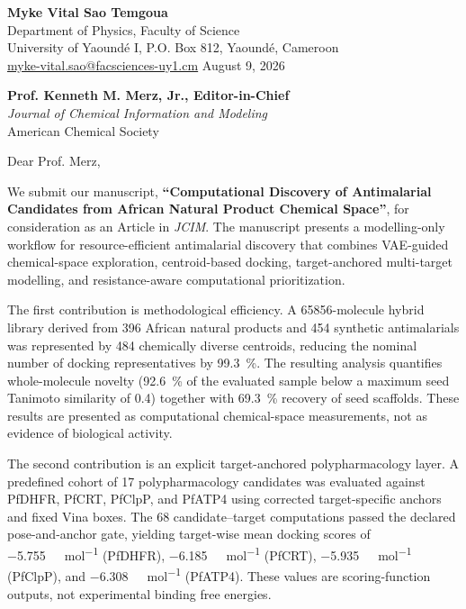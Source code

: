 \documentclass[10.5pt,letterpaper]{article}
\begin{document}
\textbf{Myke Vital Sao Temgoua}\\
Department of Physics, Faculty of Science\\
University of Yaound\'{e} I, P.O. Box 812, Yaound\'{e}, Cameroon\\
\href{mailto:myke-vital.sao@facsciences-uy1.cm}{myke-vital.sao@facsciences-uy1.cm}
\hfill August 9, 2026

\vspace{0.35em}
\textbf{Prof. Kenneth M. Merz, Jr., Editor-in-Chief}\\
\textit{Journal of Chemical Information and Modeling}\\
American Chemical Society

\vspace{0.35em}
Dear Prof. Merz,

We submit our manuscript, \textbf{``Computational Discovery of Antimalarial Candidates from African Natural Product Chemical Space''}, for consideration as an Article in \textit{JCIM}. The manuscript presents a modelling-only workflow for resource-efficient antimalarial discovery that combines VAE-guided chemical-space exploration, centroid-based docking, target-anchored multi-target modelling, and resistance-aware computational prioritization.

The first contribution is methodological efficiency. A \num{65856}-molecule hybrid library derived from \num{396} African natural products and \num{454} synthetic antimalarials was represented by \num{484} chemically diverse centroids, reducing the nominal number of docking representatives by \qty{99.3}{\percent}. The resulting analysis quantifies whole-molecule novelty (\qty{92.6}{\percent} of the evaluated sample below a maximum seed Tanimoto similarity of \num{0.4}) together with \qty{69.3}{\percent} recovery of seed scaffolds. These results are presented as computational chemical-space measurements, not as evidence of biological activity.

The second contribution is an explicit target-anchored polypharmacology layer. A predefined cohort of \num{17} polypharmacology candidates was evaluated against PfDHFR, PfCRT, PfClpP, and PfATP4 using corrected target-specific anchors and fixed Vina boxes. The \num{68} candidate--target computations passed the declared pose-and-anchor gate, yielding target-wise mean docking scores of \qty{-5.755}{\kilo\calorie\per\mole} (PfDHFR), \qty{-6.185}{\kilo\calorie\per\mole} (PfCRT), \qty{-5.935}{\kilo\calorie\per\mole} (PfClpP), and \qty{-6.308}{\kilo\calorie\per\mole} (PfATP4). These values are scoring-function outputs, not experimental binding free energies.
\end{document}
